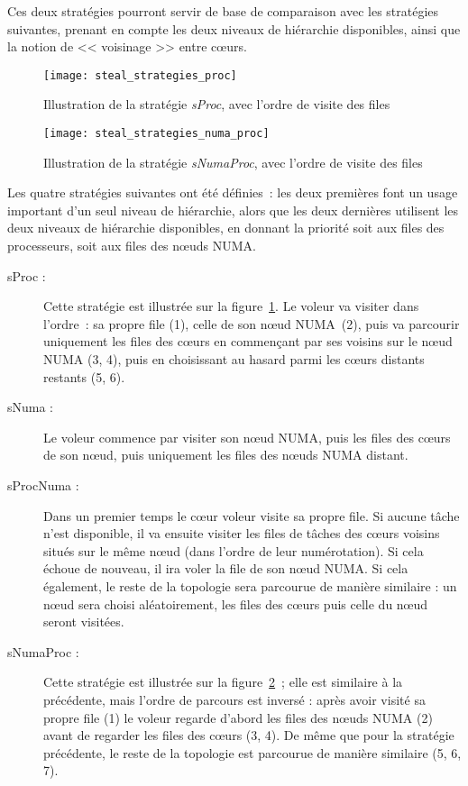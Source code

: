 Ces deux stratégies pourront servir de base de comparaison avec les stratégies suivantes, prenant en compte les deux niveaux de hiérarchie disponibles, ainsi que la notion de << voisinage >> entre cœurs.

\begin{figure}[t!]
  \centering
  \texttt{[image: steal\_strategies\_proc]}
  \caption{Illustration de la stratégie \emph{sProc}, avec l'ordre de visite des files}\label{fig:openmp:runtime:steal_proc}
\end{figure}

\begin{figure}[h!]
  \centering
  \texttt{[image: steal\_strategies\_numa\_proc]}
  \caption{Illustration de la stratégie \emph{sNumaProc}, avec l'ordre de visite des files}\label{fig:openmp:runtime:steal_numa_proc}
\end{figure}

Les quatre stratégies suivantes ont été définies~: les deux premières font un usage important d'un seul niveau de hiérarchie, alors que les deux dernières utilisent les deux niveaux de hiérarchie disponibles, en donnant la priorité soit aux files des processeurs, soit aux files des nœuds NUMA.

\begin{description}
  \item [sProc :] Cette stratégie est illustrée sur la figure~\ref{fig:openmp:runtime:steal_proc}. Le voleur va visiter dans l'ordre~: sa propre file (1), celle de son nœud NUMA (2), puis va parcourir uniquement les files des cœurs en commençant par ses voisins sur le nœud NUMA (3, 4), puis en choisissant au hasard parmi les cœurs distants restants (5, 6).
  \item [sNuma :] Le voleur commence par visiter son nœud NUMA, puis les files des cœurs de son nœud, puis uniquement les files des nœuds NUMA distant.
  \item [sProcNuma :] Dans un premier temps le cœur voleur visite sa propre file. Si aucune tâche n'est disponible, il va ensuite visiter les files de tâches des cœurs voisins situés sur le même nœud (dans l'ordre de leur numérotation).
    Si cela échoue de nouveau, il ira voler la file de son nœud NUMA.
    Si cela également, le reste de la topologie sera parcourue de manière similaire : un nœud sera choisi aléatoirement, les files des cœurs puis celle du nœud seront visitées.
  \item [sNumaProc :] Cette stratégie est illustrée sur la figure~\ref{fig:openmp:runtime:steal_numa_proc}~; elle est similaire à la précédente, mais l'ordre de parcours est inversé : après avoir visité sa propre file (1) le voleur regarde d'abord les files des nœuds NUMA (2) avant de regarder les files des cœurs (3, 4). De même que pour la stratégie précédente, le reste de la topologie est parcourue de manière similaire (5, 6, 7).
\end{description}


